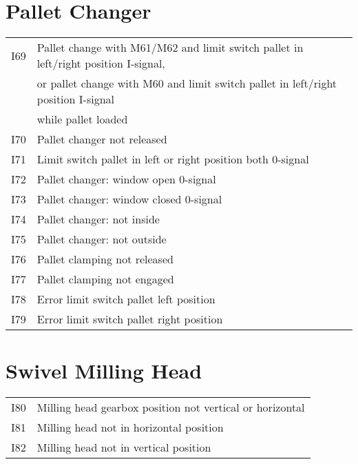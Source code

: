 \documentclass[openany,11pt]{book}
\begin{document}
\section*{Pallet Changer}

\begin{table}[!h]
    \begin{tabular}{ll}
    I69 & Pallet change with M61/M62 and limit switch pallet in left/right position I-signal, \\
        & or pallet change with M60 and limit switch pallet in left/right position I-signal \\
        & while pallet loaded \\
    I70 & Pallet changer not released \\
    I71 & Limit switch pallet in left or right position both 0-signal \\
    I72 & Pallet changer: window open 0-signal \\
    I73 & Pallet changer: window closed 0-signal \\
    I74 & Pallet changer: not inside \\
    I75 & Pallet changer: not outside \\
    I76 & Pallet clamping not released \\
    I77 & Pallet clamping not engaged \\
    I78 & Error limit switch pallet left position \\
    I79 & Error limit switch pallet right position \\
    \end{tabular}
\end{table}

\section*{Swivel Milling Head}

\begin{table}[!h]
    \begin{tabular}{ll}
    I80 & Milling head gearbox position not vertical or horizontal \\
    I81 & Milling head not in horizontal position \\
    I82 & Milling head not in vertical position \\
    \end{tabular}
\end{table}

\newpage
\end{document}
